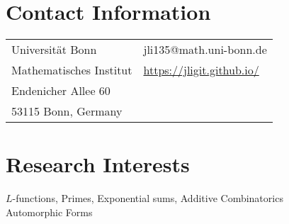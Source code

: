 \documentclass[margin,line,pifont,palatino,courier]{res}
\begin{document}

\begin{resume}

\section{\sc Contact Information}
%


\vspace{.05in}
\begin{tabular}{@{}p{2.5in}p{2.5in}}
Universit\"at Bonn               & \hfill{jli135@math.uni-bonn.de}\\

Mathematisches Institut  &  \hfill{\href{https://jligit.github.io/}{https://jligit.github.io/}}\\

Endenicher Allee 60

             & \\
53115 Bonn, Germany   & 

\end{tabular}

\section{\sc Research Interests}
$L$-functions, Primes,  Exponential sums, Additive Combinatorics\\
Automorphic Forms

\end{resume}
\end{document}
